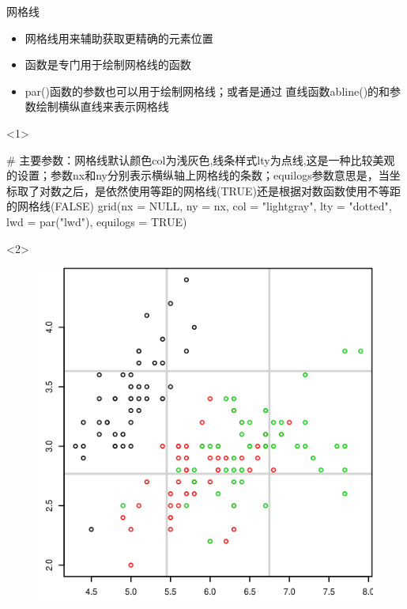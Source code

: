 \documentclass{beamerthemeMono}
\begin{document}
\begin{frame}[t,fragile]{\subsecname}{网格线}
\begin{itemize}
\item 网格线用来辅助获取更精确的元素位置
\item {}函数是专门用于绘制网格线的函数
\item par()函数的参数也可以用于绘制网格线；或者是通过
直线函数abline()的和参数绘制横纵直线来表示网格线
\end{itemize}

\begin{onlyenv}<1>
\begin{rcode}
# 主要参数：网格线默认颜色col为浅灰色,线条样式lty为点线,这是一种比较美观的设置；参数nx和ny分别表示横纵轴上网格线的条数；equilogs参数意思是，当坐标取了对数之后，是依然使用等距的网格线(TRUE)还是根据对数函数使用不等距的网格线(FALSE)
grid(nx = NULL, ny = nx, col = "lightgray", lty = "dotted", lwd = par("lwd"), equilogs = TRUE)
\end{rcode}
\end{onlyenv} 

\begin{onlyenv}<2>
\begin{figure}
 \begin{columns}
    \begin{column}[c]{.4\textwidth}
        \includegraphics[width=\columnwidth]{grid-example.png}
    \end{column}


\end{columns}
\end{figure}
\end{onlyenv}
\end{frame}
\end{document}
